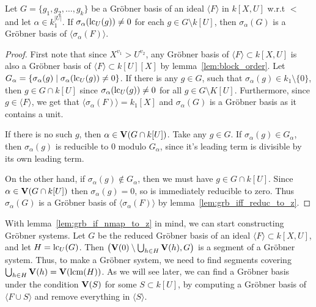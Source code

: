 \begin{lemma}\label{lem:grb_if_nmap_to_z}
  Let $G = \{g_{1}, g_{2}, \dots, g_{k}\}$ be a Gröbner basis of an ideal $\langle F \rangle$ in $k[X, U]$ w.r.t $<$ and let $\alpha \in k_{1}^{|U|}$. If $\sigma_{\alpha}(\operatorname{lc}_{U}(g)) \neq 0$ for each $g \in G \setminus k[U]$, then $\sigma_{\alpha}(G)$ is a Gröbner basis of $\langle \sigma_{\alpha}(F) \rangle$.
\end{lemma}
\begin{proof}
  First note that since $X^{v_{1}} > U^{v_{2}}$, any Gröbner basis of $\langle F \rangle \subset k[X, U]$ is also a Gröbner basis of $\langle F \rangle \subset k[U][X]$ by lemma~\ref{lem:block_order}. Let $G_{\alpha} = \{\sigma_{\alpha}(g) \mid \sigma_{\alpha}(\operatorname{lc}_{U}(g)) \neq 0\}$. If there is any $g \in G$, such that $\sigma_{\alpha}(g) \in k_{1} \setminus \{0\}$, then $g \in G \cap k[U]$ since $\sigma_{\alpha}(\operatorname{lc}_{U}(g)) \neq 0$ for all $g \in G \setminus K[U]$. Furthermore, since $g \in \langle F \rangle$, we get that $\langle \sigma_{\alpha}(F) \rangle = k_{1}[X]$ and $\sigma_{\alpha}(G)$ is a Gröbner basis as it contains a unit.

  If there is no such $g$, then $\alpha \in \operatorname{\mathbf V}(G \cap k[U])$. Take any $g \in G$. If $\sigma_{\alpha}(g) \in G_{\alpha}$, then $\sigma_{\alpha}(g)$ is reducible to $0$ modulo $G_{\alpha}$, since it's leading term is divisible by its own leading term.

  On the other hand, if $\sigma_{\alpha}(g) \notin G_{\alpha}$, then we must have $g \in G \cap k[U]$. Since $\alpha \in \operatorname{\mathbf V}(G \cap k[U])$ then $\sigma_{\alpha}(g) = 0$, so is immediately reducible to zero. Thus $\sigma_{\alpha}(G)$ is a Gröbner basis of $\langle \sigma_{\alpha}(F) \rangle$ by lemma~\ref{lem:grb_iff_reduc_to_z}.
\end{proof}

With lemma~\ref{lem:grb_if_nmap_to_z} in mind, we can start constructing Gröbner systems. Let $G$ be the reduced Gröbner basis of an ideal $\langle F \rangle \subset k[X, U]$, and let $H = \operatorname{lc}_{U}(G)$. Then $\left(\operatorname{\mathbf V}(0) \setminus \bigcup_{h \in H} \operatorname{\mathbf V}(h), G\right)$ is a segment of a Gröbner system. Thus, to make a Gröbner system, we need to find segments covering $\bigcup_{h \in H} \operatorname{\mathbf V}(h) = \operatorname{\mathbf V}(\operatorname{lcm}(H))$. As we will see later, we can find a Gröbner basis under the condition $\operatorname{\mathbf V}(S)$ for some $S \subset k[U]$, by computing a Gröbner basis of $\langle F \cup S \rangle$ and remove everything in $\langle S \rangle$.

